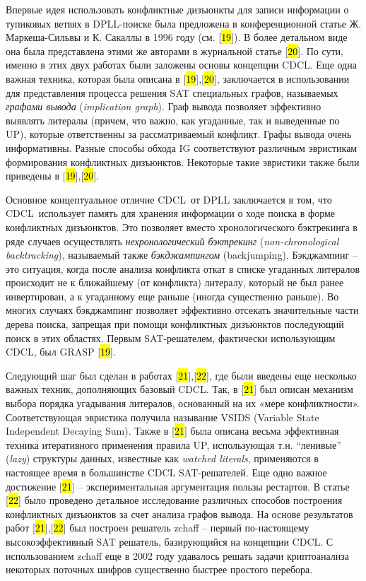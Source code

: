 Впервые идея использовать конфликтные дизъюнкты для записи информации о тупиковых ветвях в DPLL-поиске была предложена в конференционной статье Ж. Маркеша-Сильвы и К. Сакаллы в 1996 году (см. {[}\hl{19}{]}). В более детальном виде она была представлена этими же авторами в журнальной статье {[}\hl{20}{]}. По сути, именно в этих двух работах были заложены основы концепции CDCL. Еще одна важная техника, которая была описана в {[}\hl{19}{]},{[}\hl{20}{]}, заключается в использовании для представления процесса решения SAT специальных графов, называемых \textit{графами вывода} (\textit{implication graph}). Граф вывода позволяет эффективно выявлять литералы (причем, что важно, как угаданные, так и выведенные по UP), которые ответственны за рассматриваемый конфликт. Графы вывода очень информативны. Разные способы обхода IG соответствуют различным эвристикам формирования конфликтных дизъюнктов. Некоторые такие эвристики также были приведены в {[}\hl{19}{]},{[}\hl{20}{]}.

Основное концептуальное отличие CDCL~от DPLL заключается в том, что CDCL~использует память для хранения информации о ходе поиска в форме конфликтных дизъюнктов. Это позволяет вместо хронологического бэктрекинга в ряде случаев осуществлять \textit{нехронологический бэктрекинг} (\textit{non-chronological backtracking}), называемый также \textit{бэкджампингом} (backjumping). Бэкджампинг \--- это ситуация, когда после анализа конфликта откат в списке угаданных литералов происходит не к ближайшему (от конфликта) литералу, который не был ранее инвертирован, а к угаданному еще раньше (иногда существенно раньше). Во многих случаях бэкджампинг позволяет эффективно отсекать значительные части дерева поиска, запрещая при помощи конфликтных дизъюнктов последующий поиск в этих областях. Первым SAT-решателем, фактически использующим CDCL, был GRASP {[}\hl{19}{]}.

Следующий шаг был сделан в работах {[}\hl{21}{]},{[}\hl{22}{]}, где были введены еще несколько важных техник, дополняющих базовый CDCL. Так, в {[}\hl{21}{]} был описан механизм выбора порядка угадывания литералов, основанный на их «мере конфликтности». Соответствующая эвристика получила называние VSIDS (Variable State Independent Decaying Sum). Также в {[}\hl{21}{]} была описана весьма эффективная техника итеративного применения правила UP, использующая т.н. \enquote{ленивые} (\textit{lazy}) структуры данных, известные как \textit{watched literals}, применяются в настоящее время в большинстве CDCL SAT-решателей. Еще одно важное достижение {[}\hl{21}{]} \--- экспериментальная аргументация пользы рестартов. В статье {[}\hl{22}{]} было проведено детальное исследование различных способов построения конфликтных дизъюнктов за счет анализа графов вывода. На основе результатов работ {[}\hl{21}{]},{[}\hl{22}{]} был построен решатель zchaff \--- первый по-настоящему высокоэффективный SAT решатель, базирующийся на концепции CDCL. С использованием zchaff еще в 2002 году удавалось решать задачи криптоанализа некоторых поточных шифров существенно быстрее простого перебора.

